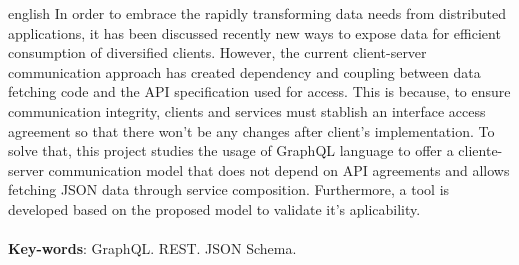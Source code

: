 \begin{resumo}[Abstract]
  \begin{otherlanguage*}{english}
  In order to embrace the rapidly transforming data needs from distributed applications, it has been discussed recently new ways to expose data for efficient consumption of diversified clients. However, the current client-server communication approach has created dependency and coupling between data fetching code and the API specification used for access. This is because, to ensure communication integrity, clients and services must stablish an interface access agreement so that there won’t be any changes after client's implementation. To solve that, this project studies the usage of GraphQL language to offer a cliente-server communication model that does not depend on API agreements and allows fetching JSON data through service composition. Furthermore, a tool is developed based on the proposed model to validate it's aplicability. \\ \\
    \textbf{Key-words}: GraphQL. REST. JSON Schema.
  \end{otherlanguage*}
\end{resumo}